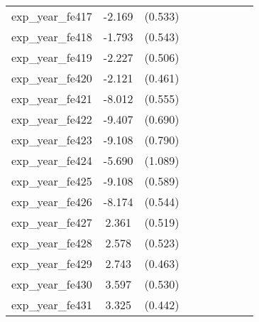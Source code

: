 {\begin{tabular}{l*{4}{cc}}
exp\_year\_fe417&   -2.169\sym{***}&  (0.533)&                  &         &                  &         &                  &         \\
exp\_year\_fe418&   -1.793\sym{***}&  (0.543)&                  &         &                  &         &                  &         \\
exp\_year\_fe419&   -2.227\sym{***}&  (0.506)&                  &         &                  &         &                  &         \\
exp\_year\_fe420&   -2.121\sym{***}&  (0.461)&                  &         &                  &         &                  &         \\
exp\_year\_fe421&   -8.012\sym{***}&  (0.555)&                  &         &                  &         &                  &         \\
exp\_year\_fe422&   -9.407\sym{***}&  (0.690)&                  &         &                  &         &                  &         \\
exp\_year\_fe423&   -9.108\sym{***}&  (0.790)&                  &         &                  &         &                  &         \\
exp\_year\_fe424&   -5.690\sym{***}&  (1.089)&                  &         &                  &         &                  &         \\
exp\_year\_fe425&   -9.108\sym{***}&  (0.589)&                  &         &                  &         &                  &         \\
exp\_year\_fe426&   -8.174\sym{***}&  (0.544)&                  &         &                  &         &                  &         \\
exp\_year\_fe427&    2.361\sym{***}&  (0.519)&                  &         &                  &         &                  &         \\
exp\_year\_fe428&    2.578\sym{***}&  (0.523)&                  &         &                  &         &                  &         \\
exp\_year\_fe429&    2.743\sym{***}&  (0.463)&                  &         &                  &         &                  &         \\
exp\_year\_fe430&    3.597\sym{***}&  (0.530)&                  &         &                  &         &                  &         \\
exp\_year\_fe431&    3.325\sym{***}&  (0.442)&                  &         &                  &         &                  &         \\

\end{tabular}}
